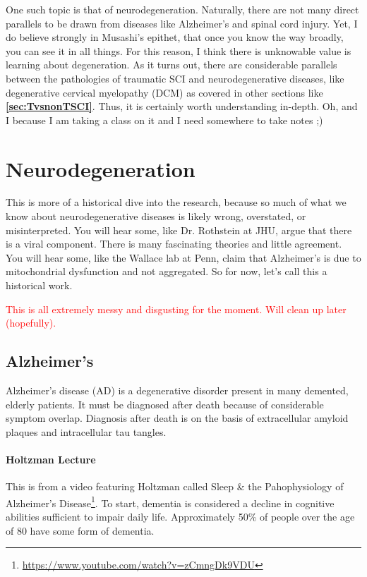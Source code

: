 One such topic is that of neurodegeneration. Naturally, there are not many direct parallels to be drawn from diseases like Alzheimer's and spinal cord injury. Yet, I do believe strongly in Musashi's epithet, that once you know the way broadly, you can see it in all things. For this reason, I think there is unknowable value is learning about degeneration. As it turns out, there are considerable parallels between the pathologies of traumatic SCI and neurodegenerative diseases, like degenerative cervical myelopathy (DCM) as covered in other sections like \textbf{\ref{sec:TvsnonTSCI}}. Thus, it is certainly worth understanding in-depth. Oh, and I because I am taking a class on it and I need somewhere to take notes ;) 

\chapter{Neurodegeneration}

This is more of a historical dive into the research, because so much of what we know about neurodegenerative diseases is likely wrong, overstated, or misinterpreted. You will hear some, like Dr. Rothstein at JHU, argue that there is a viral component. There is many fascinating theories and little agreement. You will hear some, like the Wallace lab at Penn, claim that Alzheimer's is due to mitochondrial dysfunction and not aggregated.  So for now, let's call this a historical work.\newline

\textcolor{red}{This is all extremely messy and disgusting for the moment. Will clean up later (hopefully).}\newline

\section*{Alzheimer's}

Alzheimer's disease (AD) is a degenerative disorder present in many demented, elderly patients. It must be diagnosed after death because of considerable symptom overlap. Diagnosis after death is on the basis of extracellular amyloid plaques and intracellular tau tangles. 

\subsubsection*{Holtzman Lecture} This is from a video featuring Holtzman called Sleep \& the Pahophysiology of Alzheimer's Disease\footnote{\url{https://www.youtube.com/watch?v=zCmngDk9VDU}}. To start, dementia is considered a decline in cognitive abilities sufficient to impair daily life. Approximately 50\% of people over the age of 80 have some form of dementia.\newline

